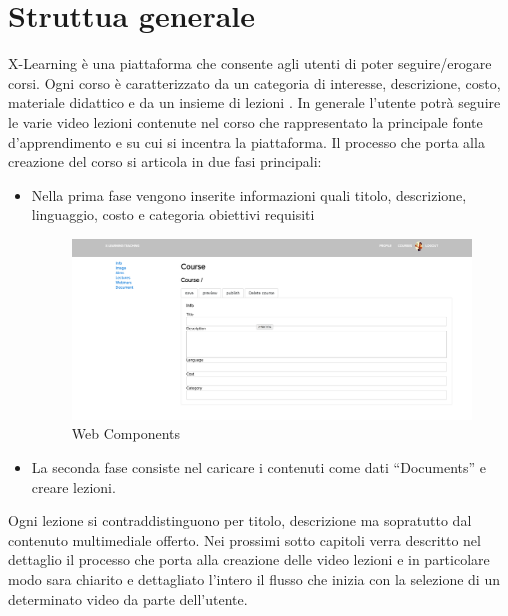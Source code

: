 \section{Struttua generale}
\label{sec:chapter_5_a_section_1}

X-Learning è una piattaforma che consente agli utenti di poter seguire/erogare corsi.
Ogni corso è caratterizzato da un categoria di interesse, descrizione, costo, materiale didattico e da un insieme di lezioni .
In generale l’utente potrà seguire le varie video lezioni contenute nel corso che rappresentato la principale fonte d’apprendimento e su cui si incentra la piattaforma.
Il processo che porta alla creazione del corso si articola in due fasi principali:
\begin{itemize}
\item Nella prima fase vengono inserite informazioni quali titolo, descrizione, linguaggio, costo e categoria obiettivi requisiti

\begin{figure}[htb]
 \centering
 \includegraphics[width=1.0\linewidth]{images/chapter6/insert_course_page.png}\hfill
 \caption[Web Components]{Web Components}
 \label{fig:fourV}
\end{figure}

\item La seconda fase consiste nel caricare i contenuti come dati “Documents”  e creare lezioni.

\end{itemize}

Ogni lezione si contraddistinguono per titolo, descrizione ma sopratutto dal contenuto multimediale offerto.
Nei prossimi sotto capitoli verra descritto nel dettaglio il processo che porta alla creazione delle video lezioni e in particolare modo sara chiarito e dettagliato l’intero il flusso che inizia con la selezione di un determinato video da parte dell’utente. 
